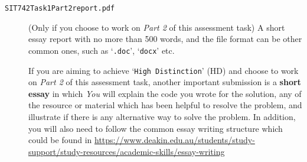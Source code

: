 \documentclass[a4paper]{article}
\begin{document}
\begin{description}
\item[\texttt{SIT742Task1Part2report.pdf}] (Only if you choose to work on \emph{Part 2} of this assessment task)
A short essay report with no more than 500 words,
and the file format can be other common ones,
such as `\texttt{.doc}', `\texttt{docx}' etc.

If you are aiming to achieve `\texttt{High Distinction}' (HD) and choose to work on \emph{Part 2} of this assessment task,
another important submission is a \textbf{short essay} 
in which \emph{You} will explain the code you wrote for the solution,
any of the resource or material which has been helpful 
to resolve the problem, 
and illustrate if there is any alternative way to solve the problem.
In addition, you will also need to follow the common essay writing structure which could be found in \url{https://www.deakin.edu.au/students/study-support/study-resources/academic-skills/essay-writing}

\end{description}

    

     
\end{document}
